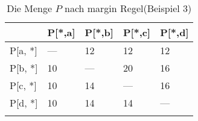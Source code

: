 \begin{longtable}[c]{|l|l|l|l|l|}
\hline
            & P{[}*,a{]} & P{[}*,b{]} & P{[}*,c{]} & P{[}*,d{]} \\ \hline
\endfirsthead
%
\endhead
%
P{[}a, *{]} & ---        & 12         & 12         & 12         \\ \hline
P{[}b, *{]} & 10         & ---        & 20         & 16         \\ \hline
P{[}c, *{]} & 10         & 14         & ---        & 16         \\ \hline
P{[}d, *{]} & 10         & 14         & 14         & ---        \\ \hline
\caption{Die Menge $P$ nach margin Regel(Beispiel 3)}
\label{beispiel3margin_p}\\
\end{longtable}